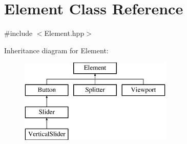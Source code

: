 \hypertarget{class_element}{}\section{Element Class Reference}
\label{class_element}


{\ttfamily \#include $<$Element.\+hpp$>$}

Inheritance diagram for Element\+:\begin{figure}[H]
\begin{center}
\leavevmode
\includegraphics[height=4.000000cm]{class_element}
\end{center}
\end{figure}
